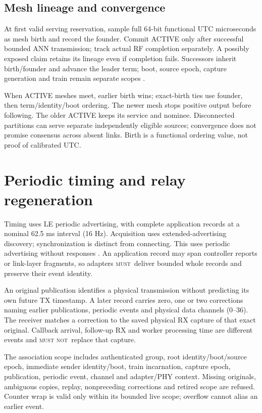 \documentclass[11pt,letterpaper]{article}
\newcommand{\must}{\textsc{must}}\newcommand{\mustnot}{\textsc{must not}}\newcommand{\should}{\textsc{should}}\newcommand{\code}[1]{\texttt{#1}}\newcommand{\page}{\clearpage}
\begin{document}
\subsection*{Mesh lineage and convergence}
At first valid serving reservation, sample full 64-bit functional UTC microseconds as mesh birth and record the founder. Commit ACTIVE only after successful bounded ANN transmission; track actual RF completion separately. A possibly exposed claim retains its lineage even if completion fails. Successors inherit birth/founder and advance the leader term; boot, source epoch, capture generation and train remain separate scopes \cite{birth}.

When ACTIVE meshes meet, earlier birth wins; exact-birth ties use founder, then term/identity/boot ordering. The newer mesh stops positive output before following. The older ACTIVE keeps its service and nominee. Disconnected partitions can serve separate independently eligible sources; convergence does not promise consensus across absent links. Birth is a functional ordering value, not proof of calibrated UTC.

\page
\section{Periodic timing and relay regeneration}
Timing uses LE periodic advertising, with complete application records at a nominal 62.5 ms interval (16 Hz). Acquisition uses extended-advertising discovery; synchronization is distinct from connecting. This uses periodic advertising without responses \cite{blecore}. An application record may span controller reports or link-layer fragments, so adapters \must\ deliver bounded whole records and preserve their event identity.

An original publication identifies a physical transmission without predicting its own future TX timestamp. A later record carries zero, one or two corrections naming earlier publications, periodic events and physical data channels (0--36). The receiver matches a correction to the saved physical RX capture of that exact original. Callback arrival, follow-up RX and worker processing time are different events and \mustnot\ replace that capture.

The association scope includes authenticated group, root identity/boot/source epoch, immediate sender identity/boot, train incarnation, capture epoch, publication, periodic event, channel and adapter/PHY context. Missing originals, ambiguous copies, replay, nonpreceding corrections and retired scope are refused. Counter wrap is valid only within its bounded live scope; overflow cannot alias an earlier event.
\end{document}
